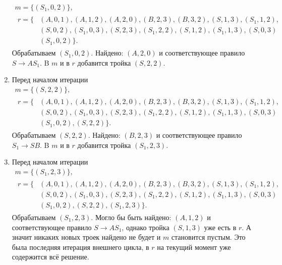 \begin{example}
\begin{enumerate}
              \begin{gather*}
                  m = \{(S_1, 0, 2)\}, \\
                  \begin{aligned}
                      r = \{ & (A, 0, 1), (A, 1, 2), (A, 2, 0), (B, 2, 3), (B, 3, 2), (S, 1, 3), (S_1, 1, 2),    \\
                             & (S, 0, 2), (S_1, 0, 3), (S, 2, 3), (S_1, 2, 2), (S, 1, 2), (S_1, 1, 3), (S, 0, 3) \\
                             & (S_1, 0, 2)\}.
                  \end{aligned}
              \end{gather*}
              Обрабатываем $(S_1, 0, 2)$.
              Найдено: $(A, 2, 0)$ и соответствующее правило $S \to A S_1$.
              B $m$ и в $r$ добавится тройка $(S, 2, 2)$.
        \item Перед началом итерации
              \begin{gather*}
                  m = \{(S, 2, 2)\}, \\
                  \begin{aligned}
                      r = \{ & (A, 0, 1), (A, 1, 2), (A, 2, 0), (B, 2, 3), (B, 3, 2), (S, 1, 3), (S_1, 1, 2),    \\
                             & (S, 0, 2), (S_1, 0, 3), (S, 2, 3), (S_1, 2, 2), (S, 1, 2), (S_1, 1, 3), (S, 0, 3) \\
                             & (S_1, 0, 2), (S, 2, 2)\}.
                  \end{aligned}
              \end{gather*}
              Обрабатываем $(S, 2, 2)$.
              Найдено: $(B, 2, 3)$ и соответствующее правило $S_1 \to S B$.
              B $m$ и в $r$ добавится тройка $(S_1, 2, 3)$.
        \item Перед началом итерации
              \begin{gather*}
                  m = \{(S_1, 2, 3)\}, \\
                  \begin{aligned}
                      r = \{ & (A, 0, 1), (A, 1, 2), (A, 2, 0), (B, 2, 3), (B, 3, 2), (S, 1, 3), (S_1, 1, 2),    \\
                             & (S, 0, 2), (S_1, 0, 3), (S, 2, 3), (S_1, 2, 2), (S, 1, 2), (S_1, 1, 3), (S, 0, 3) \\
                             & (S_1, 0, 2), (S, 2, 2), (S_1, 2, 3)\}.
                  \end{aligned}
              \end{gather*}
              Обрабатываем $(S_1, 2, 3)$.
              Могло бы быть найдено: $(A,1,2)$ и соответствующее правило $S \to A S_1$, однако тройка $(S, 1, 3)$ уже есть в $r$.
              А значит никаких новых троек найдено не будет и $m$ становится пустым.
              Это была последняя итерация внешнего цикла, в $r$ на текущий момент уже содержится всё решение.
    \end{enumerate}
\end{example}

